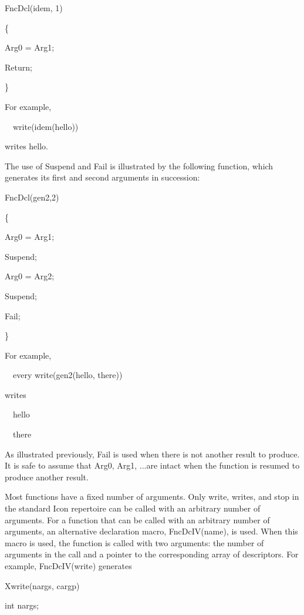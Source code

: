 {\ttfamily\mdseries
FncDcl(idem, 1)}

{\ttfamily\mdseries
\{}

{\ttfamily\mdseries
Arg0 = Arg1;}

{\ttfamily\mdseries
Return;}

{\ttfamily\mdseries
\}}


For example,

{\ttfamily\mdseries
\ \ write(idem({\textquotedbl}hello{\textquotedbl}))}

\noindent writes hello.

The use of Suspend and Fail is illustrated by the following function,
which generates its first and second arguments in succession:

{\ttfamily\mdseries
FncDcl(gen2,2)}

{\ttfamily\mdseries
\{}

{\ttfamily\mdseries
Arg0 = Arg1;}

{\ttfamily\mdseries
Suspend;}

{\ttfamily\mdseries
Arg0 = Arg2;}

{\ttfamily\mdseries
Suspend;}

{\ttfamily\mdseries
Fail;}

{\ttfamily\mdseries
\}}


For example,


\ \ every write(gen2({\textquotedbl}hello{\textquotedbl}, {\textquotedbl}there{\textquotedbl}))


writes

{\ttfamily\mdseries
\ \ hello}

{\ttfamily\mdseries
\ \ there}


As illustrated previously, Fail is used when there is not another
result to produce. It is safe to assume that Arg0, Arg1, ...are intact
when the function is resumed to produce another result.

Most functions have a fixed number of arguments. Only write, writes,
and stop in the standard Icon repertoire can be called with an
arbitrary number of arguments. For a function that can be called with
an arbitrary number of arguments, an alternative declaration macro,
FncDcIV(name), is used. When this macro is used, the function is
called with two arguments: the number of arguments in the call and a
pointer to the corresponding array of descriptors. For example,
FncDcIV(write) generates

{\ttfamily\mdseries
Xwrite(nargs, cargp)}

{\ttfamily\mdseries
int nargs;}

